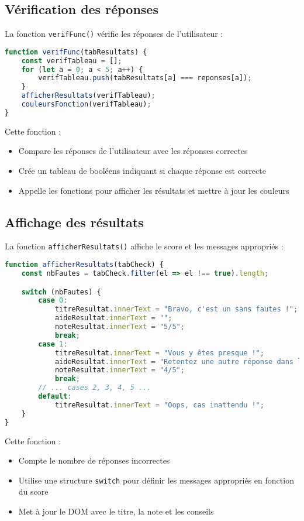 \documentclass{article}
\begin{document}
\subsection{Vérification des réponses}
La fonction \texttt{verifFunc()} vérifie les réponses de l'utilisateur :

\begin{lstlisting}[language=JavaScript]
function verifFunc(tabResultats) {
    const verifTableau = [];
    for (let a = 0; a < 5; a++) {
        verifTableau.push(tabResultats[a] === reponses[a]);
    }
    afficherResultats(verifTableau);
    couleursFonction(verifTableau);
}
\end{lstlisting}

Cette fonction :
\begin{itemize}
    \item Compare les réponses de l'utilisateur avec les réponses correctes
    \item Crée un tableau de booléens indiquant si chaque réponse est correcte
    \item Appelle les fonctions pour afficher les résultats et mettre à jour les couleurs
\end{itemize}

\subsection{Affichage des résultats}
La fonction \texttt{afficherResultats()} affiche le score et les messages appropriés :

\begin{lstlisting}[language=JavaScript]
function afficherResultats(tabCheck) {
    const nbFautes = tabCheck.filter(el => el !== true).length;

    switch (nbFautes) {
        case 0:
            titreResultat.innerText = "Bravo, c'est un sans fautes !";
            aideResultat.innerText = "";
            noteResultat.innerText = "5/5";
            break;
        case 1:
            titreResultat.innerText = "Vous y êtes presque !";
            aideResultat.innerText = "Retentez une autre réponse dans les cases rouges puis validez !";
            noteResultat.innerText = "4/5";
            break;
        // ... cases 2, 3, 4, 5 ...
        default:
            titreResultat.innerText = "Oops, cas inattendu !";
    }
}
\end{lstlisting}

Cette fonction :
\begin{itemize}
    \item Compte le nombre de réponses incorrectes
    \item Utilise une structure \texttt{switch} pour définir les messages appropriés en fonction du score
    \item Met à jour le DOM avec le titre, la note et les conseils
\end{itemize}
\end{document}
